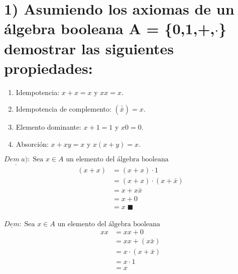 \chapter*{1) Asumiendo los axiomas de un álgebra booleana  A = \{{0,1},+,$\cdot$\} demostrar las siguientes propiedades:}
\begin{enumerate}[label=\alph*)]
	\item Idempotencia: $x+x = x $ y $ xx = x$.
	\item Idempotencia de complemento:  $(\bar{\bar{x}})= x$.
	\item Elemento dominante: $x+1 = 1$ y $x0 = 0$.
	\item Absorción: $x+xy = x$ y $x(x+y) = x$.
\end{enumerate}
\begin{multicols}{2}
	\noindent
	$\underline{Dem \;a)}:\; \text{Sea $x\in A$ un elemento del álgebra booleana}$
	\begin{align*}
		(x+x) & =(x+x)\cdot 1           \\
		      & =(x+x)\cdot (x+\bar{x}) \\
		      & =x + x\bar{x}           \\
		      & =x + 0                  \\
		      & =x\; \blacksquare       \\
	\end{align*}

	\columnbreak

	\noindent
	$\underline{Dem}:\; \text{Sea $x\in A$ un elemento del álgebra booleana}$
	\begin{align*}
		xx & =xx+0              \\
		   & =xx+(x\bar{x})     \\
		   & =x\cdot(x+\bar{x}) \\
		   & =x\cdot 1          \\
		   & =x                 \\
	\end{align*}
\end{multicols}
